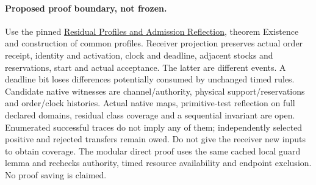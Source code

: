 \documentclass{article}
\begin{document}
\paragraph{Proposed proof boundary, not frozen.} Use the pinned \href{https://github.com/eternal-november/eos-research-programmes/blob/e1348964f73704212d2d8b48d5982a5ed600a2ff/projects/contextual-composition/feedback-and-concurrency/observable-covers/Residual_Profiles_and_Admission_Reflection.tex}{Residual Profiles and Admission Reflection}, theorem Existence and construction of common profiles. Receiver projection preserves actual order receipt, identity and activation, clock and deadline, adjacent stocks and reservations, start and actual acceptance. The latter are different events. A deadline bit loses differences potentially consumed by unchanged timed rules. Candidate native witnesses are channel/authority, physical support/reservations and order/clock histories. Actual native maps, primitive-test reflection on full declared domains, residual class coverage and a sequential invariant are open. Enumerated successful traces do not imply any of them; independently selected positive and rejected transfers remain owed. Do not give the receiver new inputs to obtain coverage. The modular direct proof uses the same cached local guard lemma and rechecks authority, timed resource availability and endpoint exclusion. No proof saving is claimed.
\end{document}
